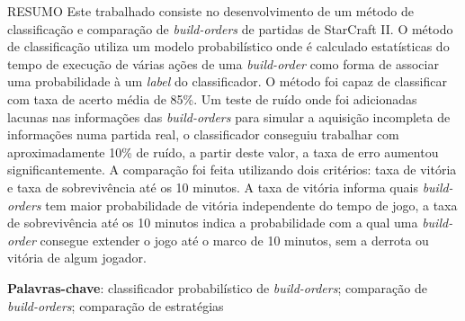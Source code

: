 \setlength{\absparsep}{18pt} %
\begin{resumo}

	RESUMO
	Este trabalhado consiste no desenvolvimento de um método de classificação e comparação de \textit{\glspl{build-order}} de partidas de StarCraft II. O método de classificação utiliza um modelo probabilístico onde é calculado estatísticas do tempo de execução de várias ações de uma \textit{\gls{build-order}} como forma de associar uma probabilidade à um \textit{label} do classificador. O método foi capaz de classificar com taxa de acerto média de 85\%. Um teste de ruído onde foi adicionadas lacunas nas informações das \textit{\glspl{build-order}} para simular a aquisição incompleta de informações numa partida real, o classificador conseguiu trabalhar com aproximadamente 10\% de ruído, a partir deste valor, a taxa de erro aumentou significantemente. A comparação foi feita utilizando dois critérios: taxa de vitória e taxa de sobrevivência até os 10 minutos. A taxa de vitória informa quais \textit{\glspl{build-order}} tem maior probabilidade de vitória independente do tempo de jogo, a taxa de sobrevivência até os 10 minutos indica a probabilidade com a qual uma \textit{\gls{build-order}} consegue extender o jogo até o marco de 10 minutos, sem a derrota ou vitória de algum jogador.

	\vspace{\onelineskip}
	\textbf{Palavras-chave}: classificador probabilístico de \textit{\glspl{build-order}}; comparação de \textit{\glspl{build-order}}; comparação de estratégias
\end{resumo}

